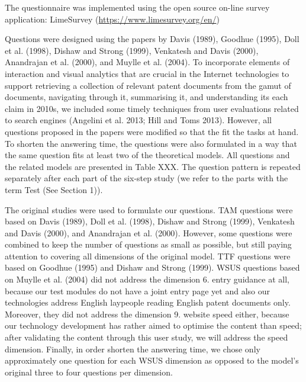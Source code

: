 \documentclass[11pt]{article}
\begin{document}
The questionnaire was implemented using the open source on-line survey application: LimeSurvey (\url{https://www.limesurvey.org/en/})

Questions were designed using the papers by Davis (1989), Goodhue (1995), Doll et al. (1998), Dishaw and Strong (1999), Venkatesh and Davis (2000), Anandrajan et al. (2000), and Muylle et al. (2004). To incorporate elements of interaction and visual analytics that are crucial in the Internet technologies to support retrieving a collection of relevant patent documents from the gamut of documents, navigating through it, summarising it, and understanding its each claim in 2010s, we included some timely techniques from user evaluations related to search engines (Angelini et al. 2013; Hill and Toms 2013).  However, all questions proposed in the papers were modified so that the fit the tasks at hand. To shorten the answering time, the questions were also formulated in a way that the same question fits at least two of the theoretical models. All questions and the related models are presented in Table XXX. The question pattern is repeated separately after each part of the six-step study (we refer to the parts with the term Test (See Section 1)).

The original studies were used to formulate our questions. TAM questions were based on Davis (1989), Doll et al. (1998), Dishaw and Strong (1999), Venkatesh and Davis (2000), and Anandrajan et al. (2000). However, some questions were combined to keep the number of questions as small as possible, but still paying attention to covering all dimensions of the original model. TTF questions were based on Goodhue (1995) and Dishaw and Strong (1999). WSUS questions based on Muylle et al. (2004) did not address the dimension 6. entry guidance at all, because our test modules do not have a joint entry page yet and also our technologies address English laypeople reading English patent documents only. Moreover, they did not address the dimension 9. website speed either, because our technology development has rather aimed to optimise the content than speed; after validating the content through this user study, we will address the speed dimension. Finally,  in order shorten the answering time, we chose only approximately one question for each WSUS dimension as opposed to the model’s original three to four questions per dimension.
\end{document}
